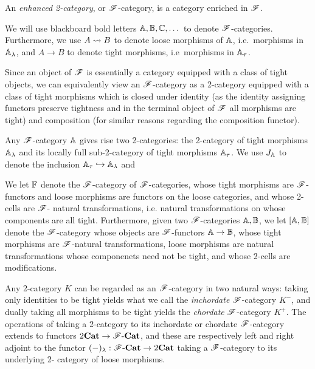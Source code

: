 \documentclass[../thesis.tex]{subfiles}
\begin{document}
  \begin{definition}
    An \emph{enhanced 2-category}, or ${\mathscr{F}}$-category, is a category enriched in ${\mathscr{F}}$.
  \end{definition}
  \begin{notation}
    We will use blackboard bold letters ${\mathbb{A}},{\mathbb{B}},{\mathbb{C}},\dots$ to denote ${\mathscr{F}}$-categories. Furthermore,
    we use $A \rightsquigarrow B$ to denote loose morphisms of ${\mathbb{A}}$, i.e.\ morphisms in ${\mathbb{A}}_\lambda$, and
    $A \to B$ to denote tight morphisms, i.e\ morphisms in ${\mathbb{A}}_\tau$.
  \end{notation}
  \begin{remark}
    Since an object of ${\mathscr{F}}$ is essentially a category equipped with a class of tight objects, we
    can equivalently view an ${\mathscr{F}}$-category as a 2-category equipped with a class of tight morphisms
    which is closed under identity (as the identity assigning functors preserve tightness and in the
    terminal object of ${\mathscr{F}}$ all morphisms are tight) and composition (for similar reasons regarding
    the composition functor).
  \end{remark}

  Any ${\mathscr{F}}$-category ${\mathbb{A}}$ gives rise two 2-categories: the 2-category of tight morphisms ${\mathbb{A}}_
  \lambda$ and its locally full sub-2-category of tight morphisms ${\mathbb{A}}_\tau$. We use $J_{\mathbb{A}}$ to
  denote the inclusion ${\mathbb{A}}_\tau \hookrightarrow {\mathbb{A}}_\lambda$ and

  We let ${\mathbb{F}}$ denote the ${\mathscr{F}}$-category of ${\mathscr{F}}$-categories, whose tight morphisms are ${\mathscr{F}}$-%
  functors and loose morphisms are functors on the loose categories, and whose 2-cells are ${\mathscr{F}}$-%
  natural transformations, i.e. natural transformations on whose components are all tight.
  Furthermore, given two ${\mathscr{F}}$-categories ${\mathbb{A}},{\mathbb{B}}$, we let $[{\mathbb{A}},{\mathbb{B}}]$ denote the ${\mathscr{F}}$-category
  whose objects are ${\mathscr{F}}$-functors ${\mathbb{A}} \to {\mathbb{B}}$, whose tight morphisms are ${\mathscr{F}}$-natural
  transformations, loose morphisms are natural transformations whose componenets need not be
  tight, and whose 2-cells are modifications.

  Any 2-category $K$ can be regarded as an ${\mathscr{F}}$-category in two natural ways: taking only
  identities to be tight yields what we call the \emph{inchordate} ${\mathscr{F}}$-category $K^-$, and 
  dually taking all morphisms to be tight yields the \emph{chordate} ${\mathscr{F}}$-category $K^+$. The
  operations of taking a 2-category to its inchordate or chordate ${\mathscr{F}}$-category extends to
  functors $2{\mathbf{Cat}} \to {\mathscr{F}}\text-{\mathbf{Cat}}$, and these are respectively left and right adjoint to the
  functor $(-)_\lambda : {\mathscr{F}}\text-{\mathbf{Cat}} \to 2{\mathbf{Cat}}$ taking a ${\mathscr{F}}$-category to its underlying 2-%
  category of loose morphisms.
\end{document}
